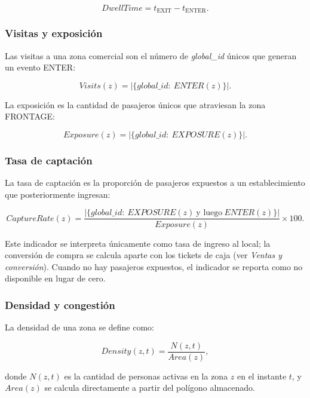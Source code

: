 \documentclass[12pt,a4paper]{article}
\begin{document}
\begin{equation}
DwellTime =
t_{\text{EXIT}}
-
t_{\text{ENTER}}.
\end{equation}

\subsubsection{Visitas y exposición}

Las visitas a una zona comercial son el número de \textit{global\_id}
únicos que generan un evento ENTER:

\begin{equation}
Visits(z)=
\big|\{global\_id:\ ENTER(z)\}\big|.
\end{equation}

La exposición es la cantidad de pasajeros únicos que atraviesan la zona
FRONTAGE:

\begin{equation}
Exposure(z)=
\big|\{global\_id:\ EXPOSURE(z)\}\big|.
\end{equation}

\subsubsection{Tasa de captación}

La tasa de captación es la proporción de pasajeros expuestos a un
establecimiento que posteriormente ingresan:

\begin{equation}
CaptureRate(z)=
\frac{\big|\{global\_id:\ EXPOSURE(z)\ \text{y luego}\ ENTER(z)\}\big|}
{Exposure(z)}
\times100.
\end{equation}

Este indicador se interpreta únicamente como tasa de ingreso al local; la
conversión de compra se calcula aparte con los tickets de caja (ver
\emph{Ventas y conversión}). Cuando no hay pasajeros expuestos, el indicador
se reporta como no disponible en lugar de cero.

\subsubsection{Densidad y congestión}

La densidad de una zona se define como:

\begin{equation}
Density(z,t)=
\frac{N(z,t)}
{Area(z)},
\end{equation}

donde $N(z,t)$ es la cantidad de personas activas en la zona $z$ en el
instante $t$, y $Area(z)$ se calcula directamente a partir del polígono
almacenado.
\end{document}
